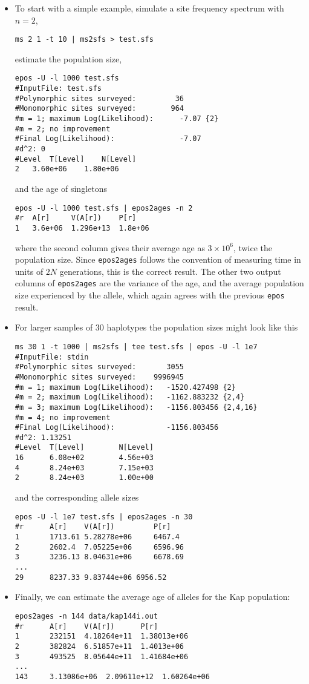 \documentclass[a4paper, english]{article}
\newcommand{\ty}{\texttt}
\begin{document}
\begin{itemize}
  \item To start with a simple example, simulate a site frequency spectrum with $n=2$,
\begin{verbatim}
ms 2 1 -t 10 | ms2sfs > test.sfs
\end{verbatim}
estimate the population size,
\begin{verbatim}
epos -U -l 1000 test.sfs
#InputFile: test.sfs
#Polymorphic sites surveyed:         36
#Monomorphic sites surveyed:        964
#m = 1; maximum Log(Likelihood):      -7.07 {2}
#m = 2; no improvement
#Final Log(Likelihood):               -7.07
#d^2: 0
#Level	T[Level]	N[Level]
2	3.60e+06	1.80e+06
\end{verbatim}
and the age of singletons
\begin{verbatim}
epos -U -l 1000 test.sfs | epos2ages -n 2
#r  A[r]     V(A[r])    P[r]
1   3.6e+06  1.296e+13  1.8e+06
\end{verbatim}
where the second column gives their average age as $3\times 10^6$,
twice the population size. Since \ty{epos2ages} follows the convention
of measuring time in units of $2N$ generations, this is the correct
result. The other two output columns of \ty{epos2ages} are the
variance of the age, and the average population size experienced by
the allele, which again agrees with the previous \ty{epos} result.
\item For larger samples of 30 haplotypes the population sizes might look like this
\begin{verbatim}
ms 30 1 -t 1000 | ms2sfs | tee test.sfs | epos -U -l 1e7
#InputFile: stdin
#Polymorphic sites surveyed:       3055
#Monomorphic sites surveyed:    9996945
#m = 1; maximum Log(Likelihood):   -1520.427498 {2}
#m = 2; maximum Log(Likelihood):   -1162.883232 {2,4}
#m = 3; maximum Log(Likelihood):   -1156.803456 {2,4,16}
#m = 4; no improvement
#Final Log(Likelihood):            -1156.803456
#d^2: 1.13251
#Level  T[Level]        N[Level]
16      6.08e+02        4.56e+03
4       8.24e+03        7.15e+03
2       8.24e+03        1.00e+00
\end{verbatim}
and the corresponding allele sizes
\begin{verbatim}
epos -U -l 1e7 test.sfs | epos2ages -n 30
#r      A[r]    V(A[r])         P[r]
1       1713.61 5.28278e+06     6467.4
2       2602.4  7.05225e+06     6596.96
3       3236.13 8.04631e+06     6678.69
...
29      8237.33	9.83744e+06	6956.52
\end{verbatim}
\item Finally, we can estimate the average age of alleles for the Kap
  population:
\begin{verbatim}
epos2ages -n 144 data/kap144i.out
#r      A[r]    V(A[r])      P[r]
1       232151  4.18264e+11  1.38013e+06
2       382824  6.51857e+11  1.4013e+06
3       493525  8.05644e+11  1.41684e+06
...
143     3.13086e+06  2.09611e+12  1.60264e+06
\end{verbatim}  
\end{itemize}
\end{document}

